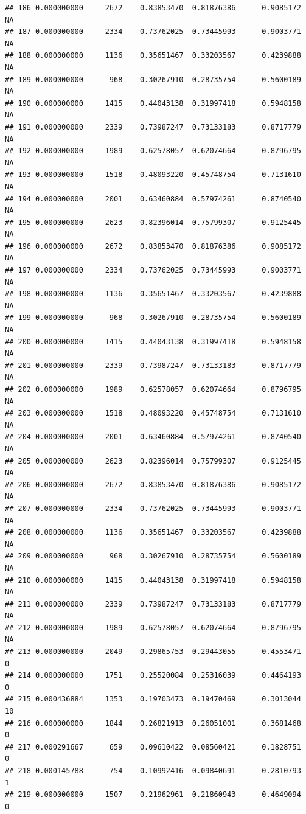 \documentclass[
]{article}
\begin{document}
\begin{verbatim}
## 186 0.000000000     2672    0.83853470  0.81876386      0.9085172      NA
## 187 0.000000000     2334    0.73762025  0.73445993      0.9003771      NA
## 188 0.000000000     1136    0.35651467  0.33203567      0.4239888      NA
## 189 0.000000000      968    0.30267910  0.28735754      0.5600189      NA
## 190 0.000000000     1415    0.44043138  0.31997418      0.5948158      NA
## 191 0.000000000     2339    0.73987247  0.73133183      0.8717779      NA
## 192 0.000000000     1989    0.62578057  0.62074664      0.8796795      NA
## 193 0.000000000     1518    0.48093220  0.45748754      0.7131610      NA
## 194 0.000000000     2001    0.63460884  0.57974261      0.8740540      NA
## 195 0.000000000     2623    0.82396014  0.75799307      0.9125445      NA
## 196 0.000000000     2672    0.83853470  0.81876386      0.9085172      NA
## 197 0.000000000     2334    0.73762025  0.73445993      0.9003771      NA
## 198 0.000000000     1136    0.35651467  0.33203567      0.4239888      NA
## 199 0.000000000      968    0.30267910  0.28735754      0.5600189      NA
## 200 0.000000000     1415    0.44043138  0.31997418      0.5948158      NA
## 201 0.000000000     2339    0.73987247  0.73133183      0.8717779      NA
## 202 0.000000000     1989    0.62578057  0.62074664      0.8796795      NA
## 203 0.000000000     1518    0.48093220  0.45748754      0.7131610      NA
## 204 0.000000000     2001    0.63460884  0.57974261      0.8740540      NA
## 205 0.000000000     2623    0.82396014  0.75799307      0.9125445      NA
## 206 0.000000000     2672    0.83853470  0.81876386      0.9085172      NA
## 207 0.000000000     2334    0.73762025  0.73445993      0.9003771      NA
## 208 0.000000000     1136    0.35651467  0.33203567      0.4239888      NA
## 209 0.000000000      968    0.30267910  0.28735754      0.5600189      NA
## 210 0.000000000     1415    0.44043138  0.31997418      0.5948158      NA
## 211 0.000000000     2339    0.73987247  0.73133183      0.8717779      NA
## 212 0.000000000     1989    0.62578057  0.62074664      0.8796795      NA
## 213 0.000000000     2049    0.29865753  0.29443055      0.4553471       0
## 214 0.000000000     1751    0.25520084  0.25316039      0.4464193       0
## 215 0.000436884     1353    0.19703473  0.19470469      0.3013044      10
## 216 0.000000000     1844    0.26821913  0.26051001      0.3681468       0
## 217 0.000291667      659    0.09610422  0.08560421      0.1828751       0
## 218 0.000145788      754    0.10992416  0.09840691      0.2810793       1
## 219 0.000000000     1507    0.21962961  0.21860943      0.4649094       0

\end{verbatim}
\end{document}

